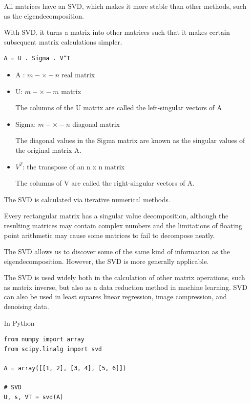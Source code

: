 All matrices have an SVD, which makes it more stable than other methods, such as the eigendecomposition.

With SVD, it turns a matrix into other matrices such that it makes certain
subsequent matrix calculations simpler.
\begin{lstlisting}
A = U . Sigma . V^T
\end{lstlisting}
\begin{itemize}
  \item A : $m-\times-n$ real matrix
  
  \item U: $m-\times-m$ matrix
 
 The columns of the U matrix are called the left-singular vectors of A
  
  \item Sigma: $m-\times-n$ diagonal matrix
  
  The diagonal values in the Sigma matrix are known as the singular values of the original matrix A. 
  
  \item $V^T$: the  transpose of an n x n matrix 

 The columns of V are called the right-singular vectors of A.
 
\end{itemize}

The SVD is calculated via iterative numerical methods.

\begin{mdframed}

Every rectangular matrix has a singular value decomposition, although the
resulting matrices may contain complex numbers and the limitations of floating
point arithmetic may cause some matrices to fail to decompose neatly.

The SVD allows us to discover some of the same kind of information as the
eigendecomposition. However, the SVD is more generally applicable.

The SVD is used widely both in the calculation of other matrix operations, such
as matrix inverse, but also as a data reduction method in machine learning. SVD
can also be used in least squares linear regression, image compression, and
denoising data.

\end{mdframed}

In Python
\begin{lstlisting}
from numpy import array
from scipy.linalg import svd

A = array([[1, 2], [3, 4], [5, 6]])

# SVD
U, s, VT = svd(A)
\end{lstlisting}

